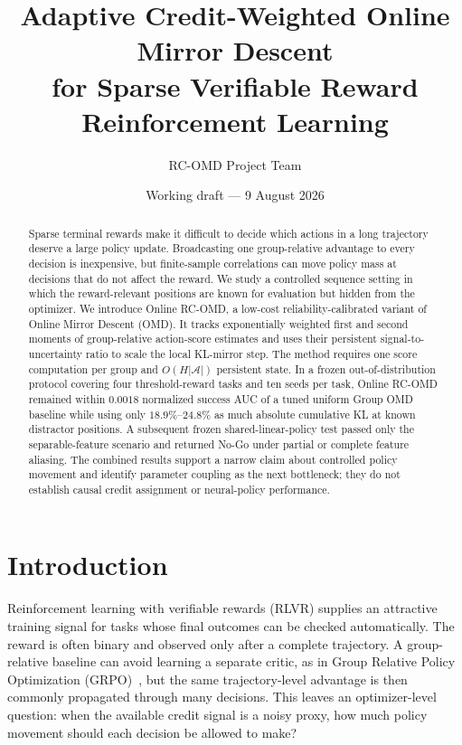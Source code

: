 \documentclass[10pt]{article}
\title{Adaptive Credit-Weighted Online Mirror Descent\\
for Sparse Verifiable Reward Reinforcement Learning}
\author{RC-OMD Project Team}
\date{Working draft --- 9 August 2026}
\newcommand{\A}{\mathcal{A}}
\begin{document}
\maketitle

\begin{abstract}
Sparse terminal rewards make it difficult to decide which actions in a long
trajectory deserve a large policy update.  Broadcasting one group-relative
advantage to every decision is inexpensive, but finite-sample correlations can
move policy mass at decisions that do not affect the reward.  We study a
controlled sequence setting in which the reward-relevant positions are known
for evaluation but hidden from the optimizer.  We introduce Online RC-OMD, a
low-cost reliability-calibrated variant of Online Mirror Descent (OMD).  It
tracks exponentially weighted first and second moments of group-relative
action-score estimates and uses their persistent signal-to-uncertainty ratio to
scale the local KL-mirror step.  The method requires one score computation per
group and $O(H|\A|)$ persistent state.  In a frozen out-of-distribution protocol
covering four threshold-reward tasks and ten seeds per task, Online RC-OMD
remained within $0.0018$ normalized success AUC of a tuned uniform Group OMD
baseline while using only $18.9\%$--$24.8\%$ as much absolute cumulative KL at
known distractor positions.  A subsequent frozen shared-linear-policy test
passed only the separable-feature scenario and returned No-Go under partial or
complete feature aliasing.  The combined results support a narrow claim about
controlled policy movement and identify parameter coupling as the next
bottleneck; they do not establish causal credit assignment or neural-policy
performance.
\end{abstract}

\section{Introduction}

Reinforcement learning with verifiable rewards (RLVR) supplies an attractive
training signal for tasks whose final outcomes can be checked automatically.
The reward is often binary and observed only after a complete trajectory.  A
group-relative baseline can avoid learning a separate critic, as in Group
Relative Policy Optimization (GRPO)~\cite{shao2024deepseekmath}, but the same
trajectory-level advantage is then commonly propagated through many decisions.
This leaves an optimizer-level question: when the available credit signal is a
noisy proxy, how much policy movement should each decision be allowed to make?
\end{document}
